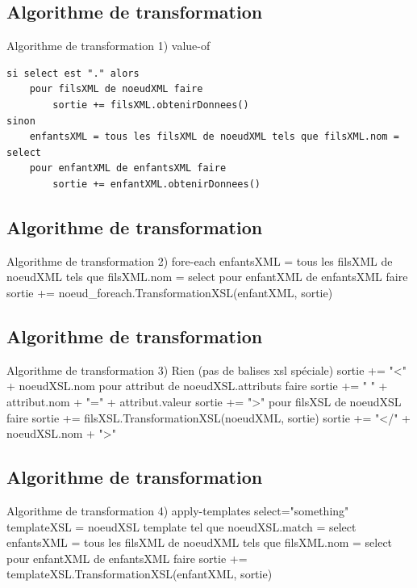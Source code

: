 \documentclass[aspectratio=169]{beamer}
\begin{document}
\subsection{Algorithme de transformation}
\begin{frame}[fragile]{Algorithme de transformation}
1) value-of
\scriptsize
\begin{verbatim}
si select est "." alors
    pour filsXML de noeudXML faire
        sortie += filsXML.obtenirDonnees()
sinon
    enfantsXML = tous les filsXML de noeudXML tels que filsXML.nom = select
    pour enfantXML de enfantsXML faire
        sortie += enfantXML.obtenirDonnees()
\end{verbatim}
\normalsize
\end{frame}

\subsection{Algorithme de transformation}
\begin{frame}[fragile]{Algorithme de transformation}
 2) fore-each
enfantsXML = tous les filsXML de noeudXML tels que filsXML.nom = select
pour enfantXML de enfantsXML faire
    sortie += noeud\_foreach.TransformationXSL(enfantXML, sortie)
\end{frame}

\subsection{Algorithme de transformation}
\begin{frame}{Algorithme de transformation}
 3) Rien (pas de balises xsl spéciale)
sortie += "<" + noeudXSL.nom
pour attribut de noeudXSL.attributs faire
    sortie += " " + attribut.nom + "=" + attribut.valeur
sortie += ">"
pour filsXSL de noeudXSL faire
    sortie += filsXSL.TransformationXSL(noeudXML, sortie)    
sortie += "</" + noeudXSL.nom + ">"
\end{frame}

\subsection{Algorithme de transformation}
\begin{frame}{Algorithme de transformation}
 4) apply-templates select="something"
templateXSL = noeudXSL template tel que noeudXSL.match = select
enfantsXML = tous les filsXML de noeudXML tels que filsXML.nom = select
pour enfantXML de enfantsXML faire
    sortie += templateXSL.TransformationXSL(enfantXML, sortie)
\end{frame}
\end{document}
